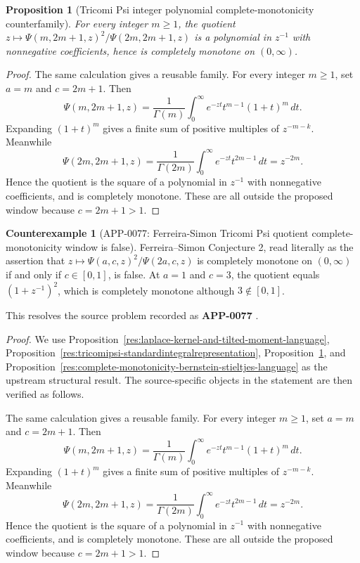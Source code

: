 \documentclass[11pt]{article}
\numberwithin{equation}{section}
\newtheorem{proposition}[theorem]{Proposition}
\theoremstyle{definition}
\newtheorem{counterexample}[theorem]{Counterexample}
\theoremstyle{remark}
\newcommand{\1}{\mathbf 1}
\begin{document}
\begin{proposition}[Tricomi Psi integer polynomial complete-monotonicity counterfamily]
\label{res:tricomipsi-integerpolynomial-cm-counterfamily}
For every integer \(m\ge1\), the quotient \(z\mapsto \Psi(m,2m+1,z)^2/\Psi(2m,2m+1,z)\) is a polynomial in \(z^{-1}\) with nonnegative coefficients, hence is completely monotone on \((0,\infty)\).
\end{proposition}

\begin{proof}
The same calculation gives a reusable family. For every integer \(m\ge1\), set \(a=m\) and \(c=2m+1\). Then
\[
\Psi(m,2m+1,z)
=\frac1{\Gamma(m)}\int_0^\infty e^{-zt}t^{m-1}(1+t)^m\,dt.
\]
Expanding \((1+t)^m\) gives a finite sum of positive multiples of \(z^{-m-k}\). Meanwhile
\[
\Psi(2m,2m+1,z)
=\frac1{\Gamma(2m)}\int_0^\infty e^{-zt}t^{2m-1}\,dt
=z^{-2m}.
\]
Hence the quotient is the square of a polynomial in \(z^{-1}\) with nonnegative coefficients, and is completely monotone. These are all outside the proposed window because \(c=2m+1>1\).
\end{proof}

\begin{counterexample}[APP-0077: Ferreira-Simon Tricomi Psi quotient complete-monotonicity window is false]
\label{res:not-tricomipsiquotient-cm-c-window}
Ferreira--Simon Conjecture 2, read literally as the assertion that \(z\mapsto \Psi(a,c,z)^2/\Psi(2a,c,z)\) is completely monotone on \((0,\infty)\) if and only if \(c\in[0,1]\), is false. At \(a=1\) and \(c=3\), the quotient equals \((1+z^{-1})^2\), which is completely monotone although \(3\notin[0,1]\).



This resolves the source problem recorded as \textbf{APP-0077} \cite{app-app-0077-source}.
\end{counterexample}

\begin{proof}
We use Proposition~\ref{res:laplace-kernel-and-tilted-moment-language}, Proposition~\ref{res:tricomipsi-standardintegralrepresentation}, Proposition~\ref{res:tricomipsi-integerpolynomial-cm-counterfamily}, and Proposition~\ref{res:complete-monotonicity-bernstein-stieltjes-language} as the upstream structural result. The source-specific objects in the statement are then verified as follows.

The same calculation gives a reusable family. For every integer \(m\ge1\), set \(a=m\) and \(c=2m+1\). Then
\[
\Psi(m,2m+1,z)
=\frac1{\Gamma(m)}\int_0^\infty e^{-zt}t^{m-1}(1+t)^m\,dt.
\]
Expanding \((1+t)^m\) gives a finite sum of positive multiples of \(z^{-m-k}\). Meanwhile
\[
\Psi(2m,2m+1,z)
=\frac1{\Gamma(2m)}\int_0^\infty e^{-zt}t^{2m-1}\,dt
=z^{-2m}.
\]
Hence the quotient is the square of a polynomial in \(z^{-1}\) with nonnegative coefficients, and is completely monotone. These are all outside the proposed window because \(c=2m+1>1\).
\end{proof}
\end{document}
